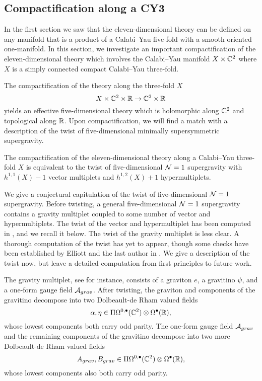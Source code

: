 \subsection{Compactification along a CY3}\label{s:CY3}

In the first section we saw that the eleven-dimensional theory can be defined on any manifold that is a product of a Calabi--Yau five-fold with a smooth oriented one-manifold. 
In this section, we investigate an important compactification of the eleven-dimensional theory which involves the Calabi--Yau manifold $X \times \mathbb C^2$ where $X$ is a simply connected compact Calabi--Yau three-fold.

The compactification of the theory along the three-fold $X$ 
\[
X \times \mathbb C^2 \times \mathbb R \to \mathbb C^2 \times \mathbb R
\]
yields an effective five-dimensional theory which is holomorphic along $\mathbb C^2$ and topological along $\mathbb R$. 
Upon compactification, we will find a match with a description of the twist of five-dimensional minimally supersymmetric supergravity. 

\begin{prop}
\label{prop:5dsugra}
The compactification of the eleven-dimensional theory along a Calabi--Yau three-fold $X$ is equivalent to the twist of five-dimensional $\mathcal N=1$ supergravity with $h^{1,1}(X)-1$ vector multiplets and $h^{1,2}(X) + 1$ hypermultiplets. 
\end{prop}

\parsec[s:5dsugra]

We give a conjectural capitulation of the twist of five-dimensional $\mathcal N=1$ supergravity. 
Before twisting, a general five-dimensional $\mathcal N=1$ supergravity contains a gravity multiplet coupled to some number of vector and hypermultiplets. 
The twist of the vector and hypermultiplet has been computed in \cite{ESW}, and we recall it below. 
The twist of the gravity multiplet is less clear. 
A thorough computation of the twist has yet to appear, though some checks have been established by Elliott and the last author in \cite{EWpoisson}. 
We give a description of the twist now, but leave a detailed computation from first principles to future work. 

The gravity multiplet, see \cite{CCDF} for instance, consists of a graviton $e$, a gravitino $\psi$, and a one-form gauge field $\mathcal A_{grav}$.
After twisting, the graviton and components of the gravitino decompose into two Dolbeault-de Rham valued fields 
\[
\alpha, \eta \in \Pi \Omega^{0,\bullet}(\mathbb C^2) \otimes \Omega^\bullet(\mathbb R) ,
\]
whose lowest components both carry odd parity. 
The one-form gauge field $\mathcal A_{grav}$ and the remaining components of the gravitino decompose into two more Dolbeault-de Rham valued fields
\[
A_{grav} , B_{grav} \in \Pi \Omega^{0,\bullet}(\mathbb C^2) \otimes \Omega^\bullet(\mathbb R) ,
\]
whose lowest components also both carry odd parity. 

